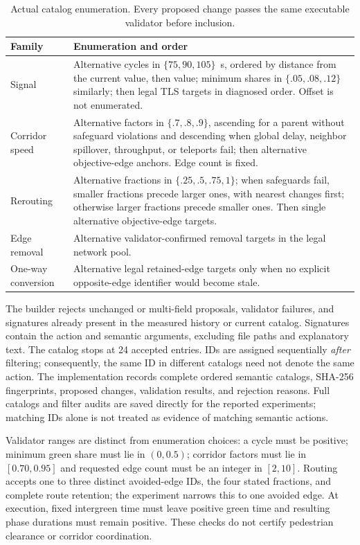 \documentclass[11pt]{article}
\begin{document}
\begin{table}[htbp]
\centering\small
\caption{Actual catalog enumeration. Every proposed change passes the same executable validator before inclusion.}\label{tab:catalog}
\begin{tabular}{p{.19\linewidth}p{.72\linewidth}}
\toprule Family & Enumeration and order \\
\midrule
Signal & Alternative cycles in $\{75,90,105\}$~s, ordered by distance from the current value, then value; minimum shares in $\{.05,.08,.12\}$ similarly; then legal TLS targets in diagnosed order. Offset is not enumerated. \\
Corridor speed & Alternative factors in $\{.7,.8,.9\}$, ascending for a parent without safeguard violations and descending when global delay, neighbor spillover, throughput, or teleports fail; then alternative objective-edge anchors. Edge count is fixed. \\
Rerouting & Alternative fractions in $\{.25,.5,.75,1\}$; when safeguards fail, smaller fractions precede larger ones, with nearest changes first; otherwise larger fractions precede smaller ones. Then single alternative objective-edge targets. \\
Edge removal & Alternative validator-confirmed removal targets in the legal network pool. \\
One-way conversion & Alternative legal retained-edge targets only when no explicit opposite-edge identifier would become stale. \\
\bottomrule
\end{tabular}
\end{table}

The builder rejects unchanged or multi-field proposals, validator failures, and signatures already present in the measured history or current catalog. Signatures contain the action and semantic arguments, excluding file paths and explanatory text. The catalog stops at 24 accepted entries. IDs are assigned sequentially \emph{after} filtering; consequently, the same ID in different catalogs need not denote the same action. The implementation records complete ordered semantic catalogs, SHA-256 fingerprints, proposed changes, validation results, and rejection reasons. Full catalogs and filter audits are saved directly for the reported experiments; matching IDs alone is not treated as evidence of matching semantic actions.

Validator ranges are distinct from enumeration choices: a cycle must be positive; minimum green share must lie in $(0,0.5)$; corridor factors must lie in $[0.70,0.95]$ and requested edge count must be an integer in $[2,10]$. Routing accepts one to three distinct avoided-edge IDs, the four stated fractions, and complete route retention; the experiment narrows this to one avoided edge. At execution, fixed intergreen time must leave positive green time and resulting phase durations must remain positive. These checks do not certify pedestrian clearance or corridor coordination.
\end{document}
